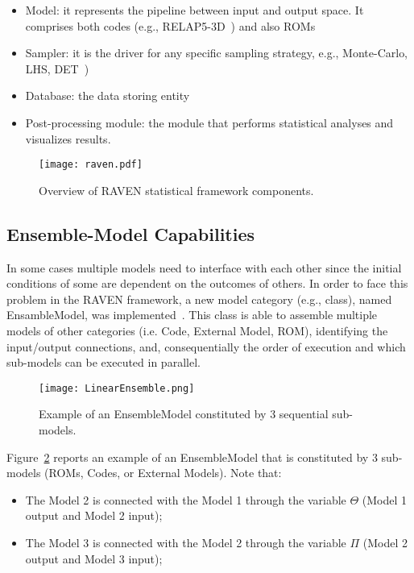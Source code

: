 \begin{itemize}
  \item Model: it represents the pipeline between input and output space. It comprises both codes 
        (e.g., RELAP5-3D~\cite{relap5}) and also ROMs 
  \item Sampler: it is the driver for any specific sampling strategy, e.g., Monte-Carlo, LHS, 
        DET~\cite{ANS2014_adaptDET,PSA2013_Raven})
  \item Database: the data storing entity
  \item Post-processing module: the module that performs statistical analyses and visualizes results.
\end{itemize}

\begin{figure}
    \centering
    \centerline{\texttt{[image: raven.pdf]}} 
    \caption{Overview of RAVEN statistical framework components.}
    \label{fig:ravenScheme}
\end{figure}

\subsection{Ensemble-Model Capabilities}

In some cases multiple models need to interface with each other since the initial 
conditions of some are dependent on the outcomes of others. In order to face this problem 
in the RAVEN framework, a new model category (e.g., class), named EnsambleModel, was 
implemented~\cite{alfonsiEnsemble}. This class is able to assemble multiple models of 
other categories (i.e. Code, External Model, ROM), identifying the input/output connections, 
and, consequentially the order of execution and which sub-models can be executed in parallel. 
 
\begin{figure}
    \centering
    \centerline{\texttt{[image: LinearEnsemble.png]}} 
    \caption{Example of an EnsembleModel constituted by 3 sequential sub-models.}
    \label{fig:exampleEnsembleModel}
\end{figure}
 
Figure~\ref{fig:exampleEnsembleModel} reports an example of an EnsembleModel that is constituted by 
3 sub-models (ROMs, Codes, or External Models). 
Note that:

\begin{itemize}
  \item The Model 2 is connected with the Model 1 through the variable $\Theta$ (Model 1 output and Model 2 input);
  \item The Model 3 is connected with the Model 2 through the variable $\Pi$ (Model 2 output and Model 3 input);
\end{itemize}

